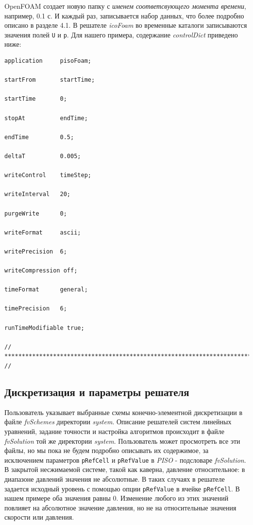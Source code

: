 OpenFOAM создает новую папку с \textit{именем соответсвующего момента времени}, например, 0.1 с. И каждый раз,
 записывается набор данных, что более подробно описано в разделе 4.1.
 В решателе \textsl{icoFoam} во временные каталоги записываются значения полей \texttt{U} и \texttt{p}.
 Для нашего примера, содержание \textit{controlDict} приведено ниже:

\begin{verbatim}
application     pisoFoam;

startFrom       startTime;

startTime       0;

stopAt          endTime;

endTime         0.5;

deltaT          0.005;

writeControl    timeStep;

writeInterval   20;

purgeWrite      0;

writeFormat     ascii;

writePrecision  6;

writeCompression off;

timeFormat      general;

timePrecision   6;

runTimeModifiable true;

// ************************************************************************* //
\end{verbatim}

\subsection{Дискретизация и параметры решателя}
\label{sec:2.1.1.5}

Пользователь указывает выбранные схемы конечно-элементной дискретизации в файле \textit{fvSchemes}
 директории \textit{system}. Описание решателей систем линейных уравнений, задание точности и настройка алгоритмов
 происходит в файле \textit{fvSolution} той же директории \textit{system}. Пользователь может просмотреть все
 эти файлы, но мы пока не будем подробно описывать их содержимое, за исключением параметров \texttt{pRefCell}
 и \texttt{pRefValue} в \textit{PISO} - подсловаре \textit{fvSolution}. В закрытой несжимаемой системе,
 такой как каверна, давление относительное: в диапазоне давлений значения не абсолютные.
 В таких случаях в решателе задается исходный уровень с помощью опции \texttt{pRefValue} в ячейке \texttt{pRefCell}.
 В нашем примере оба значения равны 0. Изменение любого из этих
 значений повлияет на абсолютное значение давления, но не на относительные значения скорости или давления.

